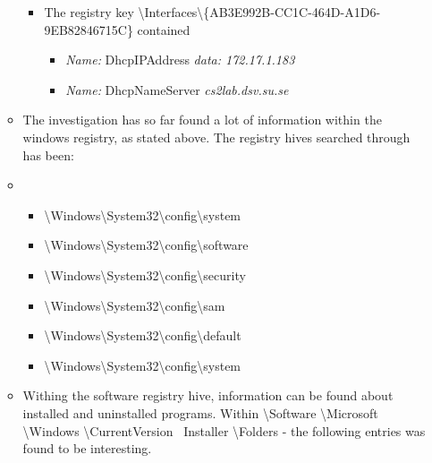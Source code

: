 \begin{enumerate}
\begin{itemize}
\begin{itemize}
\begin{itemize}
	\end{itemize}
	
	\item The registry key \textbackslash Interfaces\textbackslash \{AB3E992B-CC1C-464D-A1D6-9EB82846715C\} contained
	
	\begin{itemize}
		\item \textit{Name:} DhcpIPAddress  \textit{data: 172.17.1.183}
		\item \textit{Name:} DhcpNameServer  \textit{cs2lab.dsv.su.se}
	\end{itemize}
	
\end{itemize}

	\newpage
	\item The investigation has so far found a lot of information within the windows registry, as stated above. The registry hives searched through has been:
	
	\item 
	\begin{itemize}
		\item \textbackslash Windows\textbackslash System32\textbackslash config\textbackslash system\\ 
		\item \textbackslash Windows\textbackslash System32\textbackslash config\textbackslash software\\
		\item \textbackslash Windows\textbackslash System32\textbackslash config\textbackslash security\\
		\item \textbackslash Windows\textbackslash System32\textbackslash config\textbackslash sam \\
		\item \textbackslash Windows\textbackslash System32\textbackslash config\textbackslash default \\
		\item \textbackslash Windows\textbackslash System32\textbackslash config\textbackslash system \\
	\end{itemize} 
	
	\item Withing the software registry hive, information can be found about installed and uninstalled programs. Within \textbackslash Software \textbackslash Microsoft \textbackslash Windows \textbackslash CurrentVersion \ Installer \textbackslash Folders - the following entries was found to be interesting.
	

\end{itemize}
\end{enumerate}
